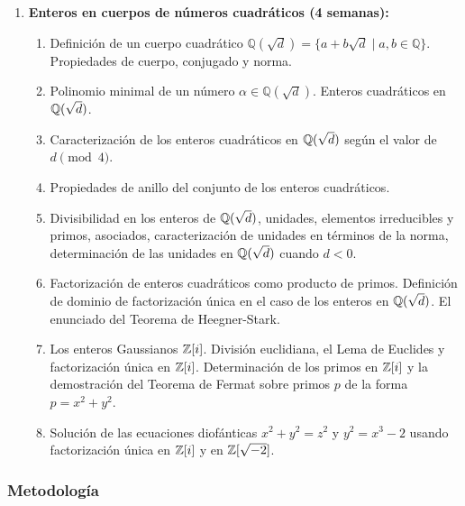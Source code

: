 \begin{refsection}
\begin{enumerate}
\item \textbf{Enteros en cuerpos de números cuadráticos (4 semanas):} 
\begin{enumerate}
    \item Definición de un cuerpo cuadrático $\mathbb{Q}(\sqrt{d}) = \{ a + b\sqrt{d} \mid a, b \in \mathbb{Q} \}$. Propiedades de cuerpo, conjugado y norma.
    \item Polinomio minimal de un número $\alpha \in \mathbb{Q}(\sqrt{d})$. Enteros cuadráticos en $\mathbb{Q}(\sqrt{d})$.
    \item Caracterización de los enteros cuadráticos en $\mathbb{Q}(\sqrt{d})$ según el valor de $d \pmod{4}$. 
    \item Propiedades de anillo del conjunto de los enteros cuadráticos.
    \item Divisibilidad en los enteros de $\mathbb{Q}(\sqrt{d})$, unidades, elementos irreducibles y primos, asociados, caracterización de unidades en términos de la norma, determinación de las unidades en $\mathbb{Q}(\sqrt{d})$ cuando $d < 0$.
    \item Factorización de enteros cuadráticos como producto de primos. Definición de dominio de factorización única en el caso de los enteros en $\mathbb{Q}(\sqrt{d})$. El enunciado del Teorema de Heegner-Stark.
    \item Los enteros Gaussianos $\mathbb{Z}[i]$. División euclidiana, el Lema de Euclides y factorización única en $\mathbb{Z}[i]$. Determinación de los primos en $\mathbb{Z}[i]$ y la demostración del Teorema de Fermat sobre primos $p$ de la forma $p = x^2 + y^2$.
    \item Solución de las ecuaciones diofánticas $x^2 + y^2 = z^2$ y $y^2 = x^3 - 2$ usando factorización única en $\mathbb{Z}[i]$ y en $\mathbb{Z}[\sqrt{-2}]$.
\end{enumerate}

\end{enumerate}

\subsubsection*{Metodología}


\end{refsection}
